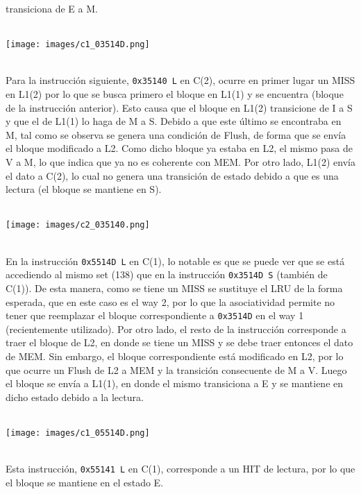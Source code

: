 \documentclass {article}
\begin{document}
transiciona de E a M.
\\
\\
\begin{centering} \texttt{[image: images/c1\_03514D.png]} \end{centering}
\\
Para la instrucción siguiente, \texttt{0x35140 L} en C(2), ocurre en primer lugar un MISS en L1(2)
por lo que se busca primero el bloque en L1(1) y se encuentra (bloque de la instrucción
anterior). Esto causa que el bloque en L1(2) transicione de I a S y que el de L1(1) lo haga de M a
S. Debido a que este último se encontraba en M, tal como se observa se genera una condición de
Flush, de forma que se envía el bloque modificado a L2. Como dicho bloque ya estaba en L2, el mismo
pasa de V a M, lo que indica que ya no es coherente con MEM. Por otro lado, L1(2) envía el dato a
C(2), lo cual no genera una transición de estado debido a que es una lectura (el bloque se mantiene
en S).
\\
\\
\begin{centering} \texttt{[image: images/c2\_035140.png]} \end{centering}
\\
En la instrucción \texttt{0x5514D L} en C(1), lo notable es que se puede ver que se está accediendo
al mismo set (138) que en la instrucción \texttt{0x3514D S} (también de C(1)). De esta manera, como
se tiene un MISS se sustituye el LRU de la forma esperada, que en este caso es el way 2, por lo que
la asociatividad permite no tener que reemplazar el bloque correspondiente a \texttt{0x3514D} en el
way 1 (recientemente utilizado). Por otro lado, el resto de la instrucción corresponde a traer el
bloque de L2, en donde se tiene un MISS y se debe traer entonces el dato de MEM. Sin embargo, el
bloque correspondiente está modificado en L2, por lo que ocurre un Flush de L2 a MEM y la transición
consecuente de M a V. Luego el bloque se envía a L1(1), en donde el mismo transiciona a E y se
mantiene en dicho estado debido a la lectura.
\\
\\
\begin{centering} \texttt{[image: images/c1\_05514D.png]} \end{centering}
\\
Esta instrucción, \texttt{0x55141 L} en C(1), corresponde a un HIT de lectura, por lo que el bloque
se mantiene en el estado E.
\\
\end{document}
